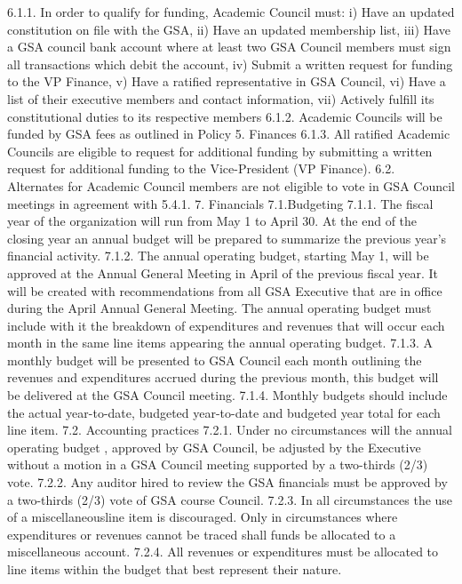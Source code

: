\documentclass{article}
\begin{document}
6.1.1. In order to qualify for funding, Academic Council must: 
i) Have an updated constitution on file with the GSA, 
ii) Have an updated membership list, 
iii) Have a GSA council bank account where at least two GSA Council 
members must sign all transactions which debit the account, 
iv) Submit a written request for funding to the VP Finance, 
v) Have a ratified representative in GSA Council, 
vi) Have a list of their executive members and contact information, 
vii) Actively fulfill its constitutional duties to its respective members 
6.1.2. Academic Councils will be funded by GSA fees as outlined in Policy 
5. Finances 
6.1.3. All ratified Academic Councils are eligible to request for additional 
funding by submitting a written request for additional funding to the 
Vice-President (VP Finance). 
6.2. Alternates for Academic Council members are not eligible to vote 
 in GSA Council meetings in agreement with 5.4.1. 
7. Financials 
7.1.Budgeting 
7.1.1. The fiscal year of the organization will run from May 1 to April 30. At 
the end of the closing year an annual budget will be prepared to 
summarize the previous year’s financial activity. 
7.1.2. The annual operating budget, starting May 1, will be approved at the 
Annual General Meeting in April of the previous fiscal year. It will be 
created with recommendations from all GSA Executive that are in 
office during the April Annual General Meeting. The annual operating 
budget must include with it the breakdown of expenditures and 
revenues that will occur each month in the same line items appearing 
the annual operating budget. 
7.1.3. A monthly budget will be presented to GSA Council each month 
outlining the revenues and expenditures accrued during the previous 
month, this budget will be delivered at the GSA Council meeting. 
7.1.4. Monthly budgets should include the actual year-to-date, budgeted 
year-to-date and budgeted year total for each line item. 
7.2. Accounting practices 
7.2.1. Under no circumstances will the annual operating budget , approved 
by GSA Council, be adjusted by the Executive without a motion in a 
GSA Council meeting supported by a two-thirds (2/3) vote. 
7.2.2. Any auditor hired to review the GSA financials must be approved by a 
two-thirds (2/3) vote of GSA course Council. 
7.2.3. In all circumstances the use of a miscellaneousline item is 
discouraged. Only in circumstances where expenditures or revenues 
cannot be traced shall funds be allocated to a miscellaneous account. 
7.2.4. All revenues or expenditures must be allocated to line items within the 
budget that best represent their nature. 
\end{document}
